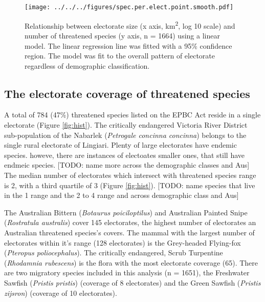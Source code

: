 \documentclass[a4paper,11pt]{article}
\begin{document}

\begin{figure}[H]
	\centering
    \texttt{[image: ../../../figures/spec.per.elect.point.smooth.pdf]}
    \caption{Relationship between electorate size (x axis, km\textsuperscript{2}, log 10 scale) and number of threatened species (y axis, n = 1664) using a linear model. The linear regression line was fitted with a 95\% confidence region. The model was fit to the overall pattern of electorate regardless of demographic classification.}
    \label{fig:point_smooth}
\end{figure}

\subsection{The electorate coverage of threatened species}

A total of 784 (47\%) threatened species listed on the EPBC Act reside in a single electorate (Figure \ref{fig:hist}).
The critically endangered Victoria River District sub-population of the Nabarlek (\emph{Petrogale concinna concinna}) belongs to the single rural electorate of Lingiari.
Plenty of large electorates have endemic species. howeve, there are instances of electoates smaller ones, that still have endmeic species.
[TODO: name more across the demographic classes and Aus]
The median number of electorates which intersect with threatened species range is 2, with a third quartile of 3 (Figure \ref{fig:hist}).
[TODO: name species that live in the 1 range and the 2 to 4 range and across demographic class and Aus]

The Australian Bittern (\emph{Botaurus poiciloptilus}) and Australian Painted Snipe (\emph{Rostratula australis}) cover 145 electorates, the highest number of electorates an Australian threatened species's covers. The mammal with the largest number of electorates within it's range (128 electorates) is the Grey-headed Flying-fox (\emph{Pteropus poliocephalus}). The critically endangered, Scrub Turpentine (\emph{Rhodamnia rubescens}) is the flora with the most electorate coverage (65).
There are two migratory species included in this analysis (n = 1651), the Freshwater Sawfish (\emph{Pristis pristis}) (coverage of 8 electorates) and the Green Sawfish (\emph{Pristis zijsron}) (coverage of 10 electorates).
\end{document}
